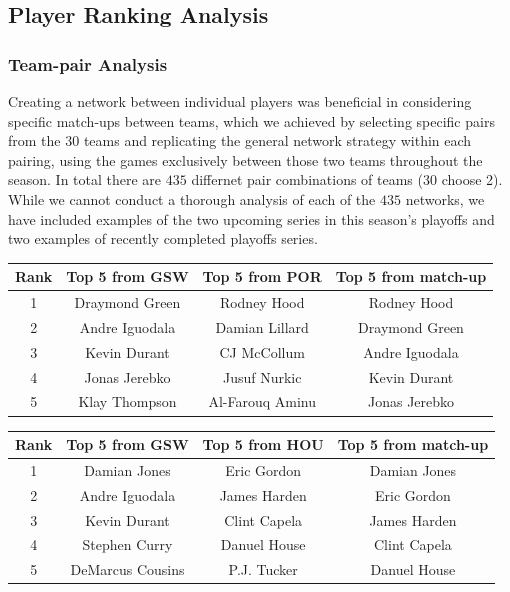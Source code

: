 \documentclass[12pt]{article}%
\begin{document}
\subsection{Player Ranking Analysis}
\subsubsection{Team-pair Analysis}
\null\quad\quad Creating a network between individual players was beneficial in considering specific match-ups between teams, which we achieved by selecting specific pairs from the $30$ teams and replicating the general network strategy within each pairing, using the games exclusively between those two teams throughout the season. In total there are $435$ differnet pair combinations of teams (30 choose 2). While we cannot conduct a thorough analysis of each of the $435$ networks, we have included examples of the two upcoming series in this season's playoffs and two examples of recently completed playoffs series.

\begin{center}
\begin{tabular}{|c|c c c|}
\hline
\textbf{Rank} &\textbf{Top 5 from GSW} &\textbf{Top 5 from POR}&\textbf{Top 5 from match-up}\\\hline
1&Draymond Green&Rodney Hood&Rodney Hood\\\hline
2&Andre Iguodala&Damian Lillard&Draymond Green\\\hline
3&Kevin Durant&CJ McCollum&Andre Iguodala\\\hline
4&Jonas Jerebko&Jusuf Nurkic&Kevin Durant\\\hline
5&Klay Thompson&Al-Farouq Aminu&Jonas Jerebko\\\hline
\end{tabular}
\end{center}
\begin{center}
\begin{tabular}{|c|c c c|}
\hline
\textbf{Rank} &\textbf{Top 5 from GSW} &\textbf{Top 5 from HOU}&\textbf{Top 5 from match-up}\\\hline
1&Damian Jones&Eric Gordon&Damian Jones\\\hline
2&Andre Iguodala&James Harden&Eric Gordon\\\hline
3&Kevin Durant&Clint Capela&James Harden\\\hline
4&Stephen Curry&Danuel House&Clint Capela\\\hline
5&DeMarcus Cousins&P.J. Tucker&Danuel House\\\hline
\end{tabular}
\end{center}
\end{document}
